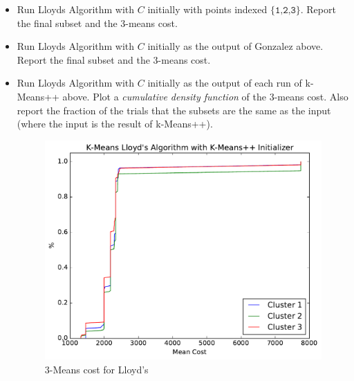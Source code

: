 \documentclass[11pt]{article}
\newcommand{\D}{\textsf{D}}
\begin{document}
\begin{itemize}
\item  Run Lloyds Algorithm with $C$ initially with points indexed $\{\texttt{1,2,3}\}$.  Report the final subset and the $3$-means cost.  
\item  Run Lloyds Algorithm with $C$ initially as the output of \textsf{Gonzalez} above.  Report the final subset and the $3$-means cost.  
\item  Run Lloyds Algorithm with $C$ initially as the output of each run of \textsf{k-Means++} above.  Plot a \emph{cumulative density function} of the $3$-means cost.  Also report the fraction of the trials that the subsets are the same as the input (where the input is the result of \textsf{k-Means++}).  


\begin{figure}[H]
\centering
\includegraphics[width=.75\textwidth]{kmeanspp_lloyds.pdf}
\caption{$3$-Means cost for Lloyd's}
\end{figure}
\end{itemize}

%
%
%
%
\end{document}

